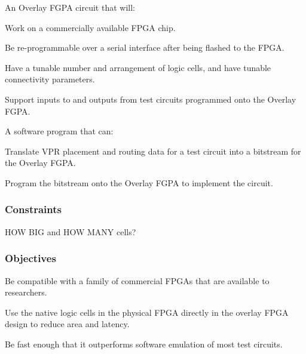 An Overlay FGPA circuit that will:

\begin{itemlist}
	\item Work on a commercially available FPGA chip.
	\item Be re-programmable over a serial interface after being flashed to the FPGA.
	\item Have a tunable number and arrangement of logic cells, and have tunable connectivity parameters. 
	\item Support inputs to and outputs from test circuits programmed onto the Overlay FGPA.
\end{itemlist}

A software program that can:
\begin{itemlist}
	\item Translate VPR placement and routing data for a test circuit into a bitstream for the Overlay FGPA.
	\item Program the bitstream onto the Overlay FGPA to implement the circuit.
\end{itemlist}

\subsubsection{Constraints}

\begin{itemlist}
	\item HOW BIG and HOW MANY cells?
\end{itemlist}


\subsubsection{Objectives}

\begin{itemlist}
	\item Be compatible with a family of commercial FPGAs that are available to researchers.
	\item Use the native logic cells in the physical FPGA directly in the overlay FPGA design to reduce area and latency.
	\item Be fast enough that it outperforms software emulation of most test circuits.
\end{itemlist}

